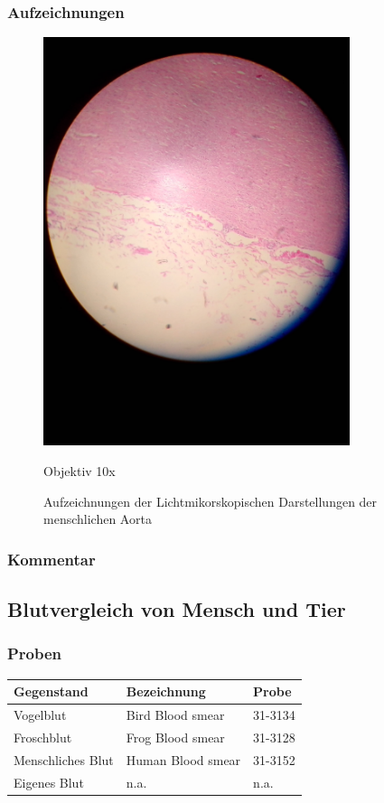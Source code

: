 \subsubsection{Aufzeichnungen}
\begin{figure}[h!]
	\centering
		\includegraphics[angle=270, width=0.8\textwidth]{../images/01_aorta.jpg}
		\caption{Objektiv 10x}
	\caption{Aufzeichnungen der Lichtmikorskopischen Darstellungen der
		menschlichen Aorta}
\end{figure}

\subsubsection{Kommentar}

\newpage
\subsection{Blutvergleich von Mensch und Tier}

\subsubsection{Proben}
\begin{table}[h!]
	\centering
	\begin{tabular}{l l l}
		Gegenstand
			& Bezeichnung
			& Probe \\
		\hline
		Vogelblut
			& Bird Blood smear
			& 31-3134 \\
		Froschblut
			& Frog Blood smear
			& 31-3128 \\
		Menschliches Blut
			& Human Blood smear
			& 31-3152 \\
		Eigenes Blut
			& n.a.
			& n.a. \\
	\end{tabular}
\end{table}

